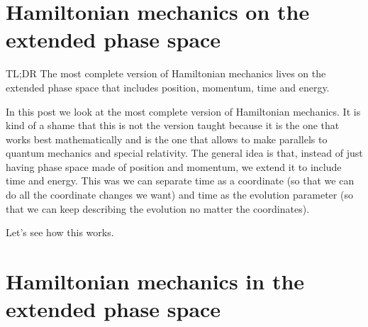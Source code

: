 \documentclass[aps,pra,10pt,floatfix,nofootinbib]{revtex4-1}
\theoremstyle{definition}
\begin{document}
\section{Hamiltonian mechanics on the extended phase space}

TL;DR The most complete version of Hamiltonian mechanics lives on the extended phase space that includes position, momentum, time and energy.

In this post we look at the most complete version of Hamiltonian mechanics. It is kind of a shame that this is not the version taught because it is the one that works best mathematically and is the one that allows to make parallels to quantum mechanics and special relativity. The general idea is that, instead of just having phase space made of position and momentum, we extend it to include time and energy. This was we can separate time as a coordinate (so that we can do all the coordinate changes we want) and time as the evolution parameter (so that we can keep describing the evolution no matter the coordinates).

Let's see how this works.

\section{Hamiltonian mechanics in the extended phase space}
\end{document}
